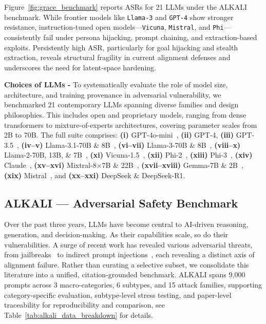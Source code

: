 Figure~\ref{fig:grace_benchmark} reports ASRs for 21 LLMs under the {\fontsize{7}{8}\selectfont ALKALI} benchmark. While frontier models like \texttt{Llama-3} and \texttt{GPT-4} show stronger resistance, instruction-tuned open models—\texttt{Vicuna}, \texttt{Mistral}, and \texttt{Phi}—consistently fail under persona hijacking, prompt chaining, and extraction-based exploits. Persistently high ASR, particularly for goal hijacking and stealth extraction, reveals structural fragility in current alignment defenses and underscores the need for latent-space hardening.

\textbf{Choices of LLMs - }  
To systematically evaluate the role of model size, architecture, and training provenance in adversarial vulnerability, we benchmarked 21 contemporary LLMs spanning diverse families and design philosophies. This includes open and proprietary models, ranging from dense transformers to mixture-of-experts architectures, covering parameter scales from 2B to 70B. The full suite comprises:  
\textbf{(i)} GPT-4o-mini~\cite{gpt-4o-mini},  
\textbf{(ii)} GPT-4,  
\textbf{(iii)} GPT-3.5~\cite{gpt4},  
\textbf{(iv–v)} Llama-3.1-70B \& 8B~\cite{llama-3.1},  
\textbf{(vi–vii)} Llama-3-70B \& 8B~\cite{llama-3},  
\textbf{(viii–x)} Llama-2-70B, 13B, \& 7B~\cite{llama-2},  
\textbf{(xi)} Vicuna-1.5~\cite{vicuna},  
\textbf{(xii)} Phi-2~\cite{phi-2},  
\textbf{(xiii)} Phi-3~\cite{phi-3},  
\textbf{(xiv)} Claude~\cite{claude},  
\textbf{(xv–xvi)} Mixtral-8$\times$7B \& 22B~\cite{mixtral},  
\textbf{(xvii–xviii)} Gemma-7B \& 2B~\cite{gemma},  
\textbf{(xix)} Mistral~\cite{mistral}, and  
\textbf{(xx–xxi)} DeepSeek \& DeepSeek-R1.


\vspace{-2mm}
\subsection{{\fontsize{6}{7}\selectfont ALKALI} — Adversarial Safety Benchmark}
\label{sec:alkali}

Over the past three years, LLMs have become central to AI-driven reasoning, generation, and decision-making. As their capabilities scale, so do their vulnerabilities. A surge of recent work has revealed various adversarial threats, from jailbreaks~\citep{wei2023jailbroken, zhu2024promptbench} to indirect prompt injections~\citep{greshake2023indirect}, each revealing a distinct axis of alignment failure. Rather than curating a selective subset, we consolidate this literature into a unified, citation-grounded benchmark. {\fontsize{6}{7}\selectfont ALKALI} spans 9,000 prompts across 3 macro-categories, 6 subtypes, and 15 attack families, supporting category-specific evaluation, subtype-level stress testing, and paper-level traceability for reproducibility and comparison, see Table~\ref{tab:alkali_data_breakdown} for details.




